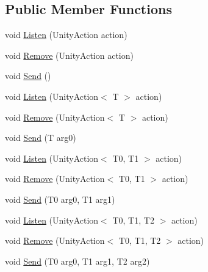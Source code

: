 \subsection*{Public Member Functions}
\begin{DoxyCompactItemize}
\item 
void \mbox{\hyperlink{class_valve_1_1_v_r_1_1_steam_v_r___events_1_1_event_aba909cc96e966145932d193aaa4b1e98}{Listen}} (Unity\+Action action)
\item 
void \mbox{\hyperlink{class_valve_1_1_v_r_1_1_steam_v_r___events_1_1_event_a46f2b8f3c76d3115ff626f3f81b2d25d}{Remove}} (Unity\+Action action)
\item 
void \mbox{\hyperlink{class_valve_1_1_v_r_1_1_steam_v_r___events_1_1_event_a2e2bed3d2e9b31cd2b54f843a4524285}{Send}} ()
\item 
void \mbox{\hyperlink{class_valve_1_1_v_r_1_1_steam_v_r___events_1_1_event_ae0c83128ec4757fc0d20e19de8a9be1d}{Listen}} (Unity\+Action$<$ T $>$ action)
\item 
void \mbox{\hyperlink{class_valve_1_1_v_r_1_1_steam_v_r___events_1_1_event_a9c2d2158b4112e647f9ae5a153b9e206}{Remove}} (Unity\+Action$<$ T $>$ action)
\item 
void \mbox{\hyperlink{class_valve_1_1_v_r_1_1_steam_v_r___events_1_1_event_a2d0c8107665fbb38ab43bc80fc283982}{Send}} (T arg0)
\item 
void \mbox{\hyperlink{class_valve_1_1_v_r_1_1_steam_v_r___events_1_1_event_afd37f17cf60ce691ed4841bf530148d3}{Listen}} (Unity\+Action$<$ T0, T1 $>$ action)
\item 
void \mbox{\hyperlink{class_valve_1_1_v_r_1_1_steam_v_r___events_1_1_event_ae05966f336e6fa7a5bcc864b4e9cb6b8}{Remove}} (Unity\+Action$<$ T0, T1 $>$ action)
\item 
void \mbox{\hyperlink{class_valve_1_1_v_r_1_1_steam_v_r___events_1_1_event_a7cae509468245af221f710c4d8312ed7}{Send}} (T0 arg0, T1 arg1)
\item 
void \mbox{\hyperlink{class_valve_1_1_v_r_1_1_steam_v_r___events_1_1_event_a5ef4a196ecb729036d38867c3350448a}{Listen}} (Unity\+Action$<$ T0, T1, T2 $>$ action)
\item 
void \mbox{\hyperlink{class_valve_1_1_v_r_1_1_steam_v_r___events_1_1_event_a6bf82abbd94b3d724e1feaec30063637}{Remove}} (Unity\+Action$<$ T0, T1, T2 $>$ action)
\item 
void \mbox{\hyperlink{class_valve_1_1_v_r_1_1_steam_v_r___events_1_1_event_ad8515dba66bf603a85a343211e040069}{Send}} (T0 arg0, T1 arg1, T2 arg2)
\end{DoxyCompactItemize}


